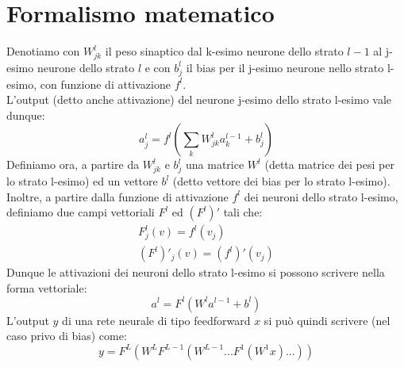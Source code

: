 \documentclass[Lau, noexaminfo, oneside]{sapthesis} %
\begin{document}
\section{Formalismo matematico}
Denotiamo con $W_{jk}^l$ il peso sinaptico dal k-esimo neurone dello strato $l-1$ al j-esimo neurone dello strato $l$ e con $b^l_j$ il bias per il j-esimo neurone nello strato l-esimo, con funzione di attivazione $f^l$.\\
L'output (detto anche attivazione) del neurone j-esimo dello strato l-esimo vale dunque:
\begin{equation}
a_j^l = f^l(\sum_k W_{jk}^l a_k^{l-1} + b_j^l)
\label{attivazioni}
\end{equation}
Definiamo ora, a partire da $W_{jk}^l$ e $b^l_j$ una matrice $W^l$ (detta matrice dei pesi per lo strato l-esimo) ed un vettore $b^l$ (detto vettore dei bias per lo strato l-esimo).
Inoltre, a partire dalla funzione di attivazione $f^l$ dei neuroni dello strato l-esimo, definiamo due campi vettoriali $F^l$ ed $(F^l)'$ tali che:
\begin{align}
F^l_j(v) = f^l(v_j)\\
(F^l)'_j(v) = (f^l)'(v_j)
\end{align}
Dunque le attivazioni dei neuroni dello strato l-esimo si possono scrivere nella forma vettoriale:
\begin{equation}
a^l = F^l(W^l a^{l-1} + b^l)
\end{equation}
L'output $y$ di una rete neurale di tipo feedforward $x$ si può quindi scrivere (nel caso privo di bias) come:
\begin{equation}
y = F^L (W^L F^{L-1}(W^{L-1} ... F^1 ( W^1 x ) ... ))
\end{equation}
\end{document}
